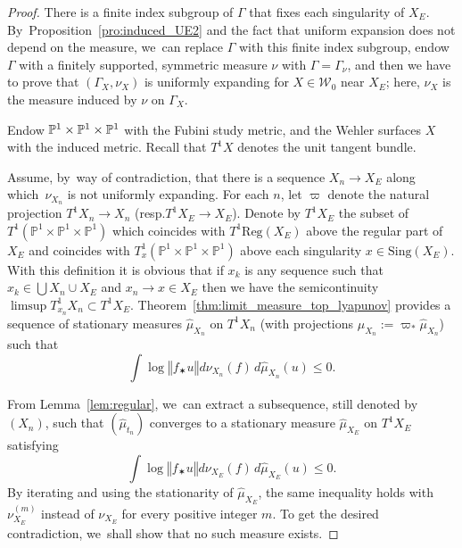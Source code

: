 \documentclass[11pt]{article}
\newcommand{\resp}{resp.\xspace}
\newcommand{\norm}[1]{{\left\Vert#1\right\Vert}}
\newcommand{\pu}{{\mathbb{P}^1}}
\newcommand{\lrpar}[1]{\left(#1\right)}
\newcommand{\cW}{\mathcal{W}}
\newcommand{\Sing}{{\mathrm{Sing}}}
\theoremstyle{plain}
\theoremstyle{definition}
\numberwithin{equation}{section}
\begin{document}
\begin{proof}
There is a finite index subgroup of $\Gamma$ that
fixes each singularity of $X_E$. By~Proposition~\ref{pro:induced_UE2} and the fact that uniform expansion does not depend on the measure, we~can replace $\Gamma$ with this finite index subgroup, endow $\Gamma$ with a finitely supported, symmetric measure $\nu$ with $\Gamma=\Gamma_\nu$, and then we have to prove that $(\Gamma_X, \nu_X)$ is uniformly expanding for $X\in \cW_0$ near $X_E$; here, $\nu_X$ is the measure induced by $\nu$ on $\Gamma_X$.

Endow $\P^1\times \P^1\times \P^1$ with the Fubini study metric, and the Wehler surfaces $X$ with the induced metric. Recall that $T^1X$ denotes the unit tangent bundle.

Assume, by~way of contradiction, that there is a sequence
$X_n\to X_E$ along which~$\nu_{X_n}$ is not uniformly expanding.
For each $n$, let $\varpi$ denote the natural projection $T^1X_n\to X_n$ (\resp $T^1X_E\to X_E$).
Denote by $T^1X_E$ the subset of $T^1(\pu\times \pu\times \pu)$ which coincides with $T^1 \mathrm{Reg}(X_E)$ above the regular part of $X_E$ and coincides with $T^1_x(\pu\times \pu\times \pu)$ above each singularity $x\in \Sing(X_E)$. With this definition it is obvious that
if $x_k$ is any sequence such that $x_k\in \bigcup X_n\cup X_E$ and $x_n\to x\in X_E$
then we have the semicontinuity
$ \limsup T^1_{x_n}X_n\subset T^1X_E$. Theorem~\ref{thm:limit_measure_top_lyapunov}
provides a sequence of stationary measures $\hat \mu_{X_n}$ on $T^1X_n$ (with projections $\mu_{X_n}:=\varpi_*\hat\mu_{X_n}$) such that
\begin{equation*}
\int \log\norm{f_\varstar u} d\nu_{X_n}(f) \, d\hat \mu_{X_n} (u)\leq 0.
\end{equation*}

From Lemma~\ref{lem:regular}, we~can extract a subsequence, still denoted by $(X_n)$,
such that $\lrpar{\hat \mu_{t_n}}$ converges to a stationary measure $\hat \mu_{X_E}$ on $T^1X_E$ satisfying
\begin{equation*}
\int \log\norm{f_\varstar u} d\nu_{X_E}(f) \, d\hat \mu_{X_E} (u)\leq 0.
\end{equation*}
By iterating and using the stationarity of $\hat \mu_{X_E}$, the same inequality holds with $\nu_{X_E}^{(m)}$ instead of $\nu_{X_E}$ for every positive integer $m$. To get the desired contradiction, we~shall show that no such measure exists.


\end{proof}
\end{document}
